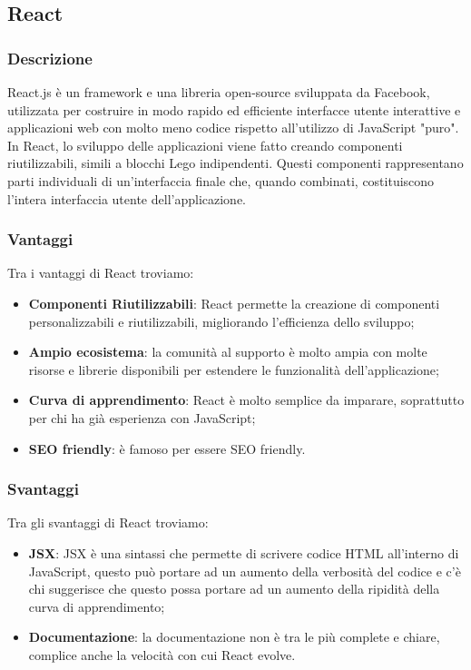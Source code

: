 \subsection*{React}

\subsubsection*{Descrizione}
React.js è un framework e una libreria open-source sviluppata da Facebook, utilizzata per costruire in modo rapido ed efficiente interfacce utente interattive e applicazioni web con molto meno codice rispetto all'utilizzo di JavaScript "puro".\\

In React, lo sviluppo delle applicazioni viene fatto creando componenti riutilizzabili, simili a blocchi Lego indipendenti. Questi componenti rappresentano parti individuali di un'interfaccia finale che, quando combinati, costituiscono l'intera interfaccia utente dell'applicazione.
\subsubsection*{Vantaggi}
Tra i vantaggi di React troviamo:
\begin{itemize}
    \item \textbf{Componenti Riutilizzabili}: React permette la creazione di componenti personalizzabili e riutilizzabili, migliorando l'efficienza dello sviluppo;
    \item \textbf{Ampio ecosistema}: la comunità al supporto è molto ampia con molte risorse e librerie disponibili per estendere le funzionalità dell'applicazione;
    \item \textbf{Curva di apprendimento}: React è molto semplice da imparare, soprattutto per chi ha già esperienza con JavaScript;
    \item \textbf{SEO friendly}: è famoso per essere SEO friendly.
\end{itemize}

\subsubsection*{Svantaggi}
Tra gli svantaggi di React troviamo:
\begin{itemize}
    \item \textbf{JSX}: JSX è una sintassi che permette di scrivere codice HTML all'interno di JavaScript, questo può portare ad un aumento della verbosità del codice e c'è chi suggerisce che questo possa portare ad un aumento della ripidità della curva di apprendimento;
    \item \textbf{Documentazione}: la documentazione non è tra le più complete e chiare, complice anche la velocità con cui React evolve.

\end{itemize}


